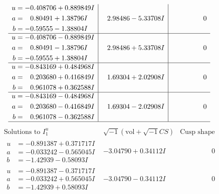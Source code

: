 \documentclass[1p]{elsarticle_modified}
\theoremstyle{definition}
\newcommand{\I}{\sqrt{-1}}
\begin{document}
$$\begin{array}{c|c|c}
\begin{aligned}
u &= -0.408706 + 0.889849 I \\
a &= \phantom{-}0.80491 + 1.38796 I \\
b &= -0.59555 - 1.38804 I\end{aligned}
 & \phantom{-}2.98486 - 5.33708 I & \phantom{-0.000000 } 0 \\ \hline\begin{aligned}
u &= -0.408706 - 0.889849 I \\
a &= \phantom{-}0.80491 - 1.38796 I \\
b &= -0.59555 + 1.38804 I\end{aligned}
 & \phantom{-}2.98486 + 5.33708 I & \phantom{-0.000000 } 0 \\ \hline\begin{aligned}
u &= -0.843169 + 0.484968 I \\
a &= \phantom{-}0.203680 + 0.416849 I \\
b &= \phantom{-}0.961078 + 0.362588 I\end{aligned}
 & \phantom{-}1.69304 + 2.02908 I & \phantom{-0.000000 } 0 \\ \hline\begin{aligned}
u &= -0.843169 - 0.484968 I \\
a &= \phantom{-}0.203680 - 0.416849 I \\
b &= \phantom{-}0.961078 - 0.362588 I\end{aligned}
 & \phantom{-}1.69304 - 2.02908 I & \phantom{-0.000000 } 0\\
 \hline 
 \end{array}$$\newpage$$\begin{array}{c|c|c}  
\text{Solutions to }I^u_{1}& \I (\text{vol} + \sqrt{-1}CS) & \text{Cusp shape}\\
 \hline 
\begin{aligned}
u &= -0.891387 + 0.371717 I \\
a &= -0.033242 - 0.565045 I \\
b &= -1.42939 - 0.58093 I\end{aligned}
 & -3.04790 + 0.34112 I & \phantom{-0.000000 } 0 \\ \hline\begin{aligned}
u &= -0.891387 - 0.371717 I \\
a &= -0.033242 + 0.565045 I \\
b &= -1.42939 + 0.58093 I\end{aligned}
 & -3.04790 - 0.34112 I & \phantom{-0.000000 } 0 \\ \hline\begin{aligned}

\end{aligned}
\end{array}$$
\end{document}
